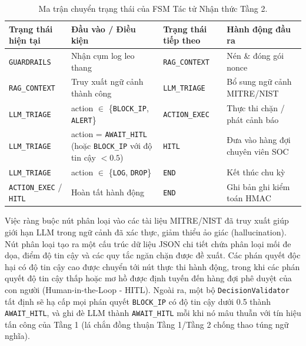 \begin{table}[H]
    \centering
    \caption{Ma trận chuyển trạng thái của FSM Tác tử Nhận thức Tầng 2.}
    \label{tab:agent_fsm_transitions}
    \begin{tabular}{|>{\raggedright\arraybackslash}p{}|>{\raggedright\arraybackslash}p{}|>{\raggedright\arraybackslash}p{}|>{\raggedright\arraybackslash}p{}|}
        \hline
        \textbf{Trạng thái hiện tại} & \textbf{Đầu vào / Điều kiện} & \textbf{Trạng thái tiếp theo} & \textbf{Hành động đầu ra} \\
        \hline
        \texttt{GUARDRAILS} & Nhận cụm log leo thang & \texttt{RAG\_CONTEXT} & Nén \& đóng gói nonce \\
        \hline
        \texttt{RAG\_CONTEXT} & Truy xuất ngữ cảnh thành công & \texttt{LLM\_TRIAGE} & Bổ sung ngữ cảnh MITRE\slash NIST \\
        \hline
        \texttt{LLM\_TRIAGE} & action $\in$ \{\texttt{BLOCK\_IP}, \texttt{ALERT}\} & \texttt{ACTION\_EXEC} & Thực thi chặn / phát cảnh báo \\
        \hline
        \texttt{LLM\_TRIAGE} & action = \texttt{AWAIT\_HITL} (hoặc \texttt{BLOCK\_IP} với độ tin cậy $<0.5$) & \texttt{HITL} & Đưa vào hàng đợi chuyên viên SOC \\
        \hline
        \texttt{LLM\_TRIAGE} & action $\in$ \{\texttt{LOG}, \texttt{DROP}\} & \texttt{END} & Kết thúc chu kỳ \\
        \hline
        \texttt{ACTION\_EXEC} / \texttt{HITL} & Hoàn tất hành động & \texttt{END} & Ghi bản ghi kiểm toán HMAC \\
        \hline
    \end{tabular}
\end{table}

Việc ràng buộc nút phân loại vào các tài liệu MITRE/NIST đã truy xuất giúp giới hạn LLM trong ngữ cảnh đã xác thực, giảm thiểu ảo giác (hallucination). Nút phân loại tạo ra một cấu trúc dữ liệu JSON chi tiết chứa phân loại mối đe dọa, điểm độ tin cậy và các quy tắc ngăn chặn được đề xuất. Các phán quyết độc hại có độ tin cậy cao được chuyển tới nút thực thi hành động, trong khi các phán quyết độ tin cậy thấp hoặc mơ hồ được định tuyến đến hàng đợi phê duyệt của con người (Human-in-the-Loop - HITL). Ngoài ra, một bộ \texttt{DecisionValidator} tất định sẽ hạ cấp mọi phán quyết \texttt{BLOCK\_IP} có độ tin cậy dưới 0.5 thành \texttt{AWAIT\_HITL}, và ghi đè LLM thành \texttt{AWAIT\_HITL} mỗi khi nó mâu thuẫn với tín hiệu tấn công của Tầng 1 (lá chắn đồng thuận Tầng 1/Tầng 2 chống thao túng ngữ nghĩa).

